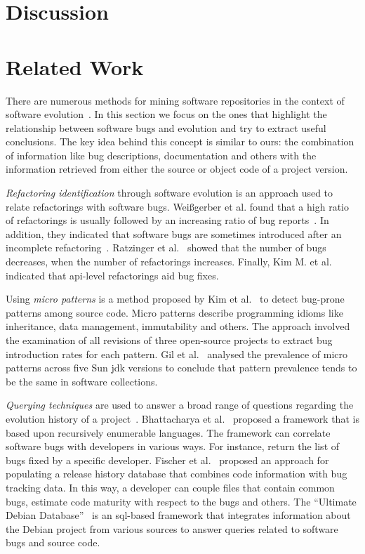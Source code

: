 \documentclass[conference]{llncs}
\begin{document}
\section{Discussion}
\label{sec:dis}

\section{Related Work}
\label{sec:rel}

There are numerous methods for mining software repositories in the context
of software evolution~\cite{KCM07}. In this section we focus on the ones
that highlight the relationship between software bugs and evolution and try to
extract useful conclusions. The key idea behind this concept is
similar to ours: the combination of information like bug descriptions,
documentation and others with the information retrieved from either the source
or object code of a project version.

{\it Refactoring identification} through software evolution is an approach used to
relate refactorings with software bugs. Wei{\ss}gerber et al. found that a high
ratio of refactorings is usually followed by an increasing ratio of bug
reports~\cite{WD06}. In addition, they indicated that software bugs are sometimes introduced
after an incomplete refactoring~\cite{GW05}.
Ratzinger et al.~\cite{RSG08} showed that the number of bugs decreases, when the number of
refactorings increases. Finally, Kim M. et al.~\cite{KCK11} indicated that {\sc api}-level
refactorings aid bug fixes.

Using {\it micro patterns} is a method proposed by Kim et al.~\cite{KPW06}
to detect bug-prone patterns among source code. Micro patterns describe programming
idioms like inheritance, data management, immutability and others. The approach involved
the examination of all revisions of three open-source projects to extract bug
introduction rates for each pattern. Gil et al.~\cite{GM05} analysed the
prevalence of micro patterns across five Sun {\sc jdk} versions to conclude that
pattern prevalence tends to be the same in software collections.

{\it Querying techniques} are used to answer a broad range of questions
regarding the evolution history of a project~\cite{HG05}. Bhattacharya et
al.~\cite{BN11}\cite{B11} proposed a framework that is based upon
recursively enumerable languages. The framework can correlate software
bugs with developers in various ways. For instance, return the list of
bugs fixed by a specific developer. Fischer et al.~\cite{FPG03} proposed
an approach for populating a release history database that combines code
information with bug tracking data. In this way, a developer can couple files
that contain common bugs, estimate code maturity with respect to the bugs
and others. The ``Ultimate Debian Database''~\cite{NZ10} is an {\sc sql}-based
framework that integrates information about the Debian project from various
sources to answer queries related to software bugs and source code.
\end{document}
